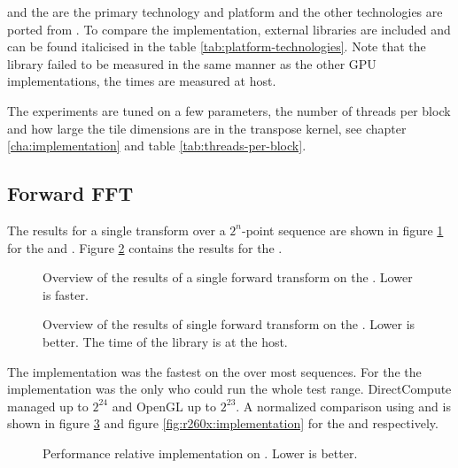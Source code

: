 {\CU} and the {\NVCARD} are the primary technology and platform and the other technologies are ported from {\CU}. To compare the implementation, external libraries are included and can be found italicised in the table \ref{tab:platform-technologies}. Note that the {\CLFFT} library failed to be measured in the same manner as the other GPU implementations, the times are measured at host.

The experiments are tuned on a few parameters, the number of threads per block and how large the tile dimensions are in the transpose kernel, see chapter \ref{cha:implementation} and table \ref{tab:threads-per-block}.

\subsection{Forward FFT}

The results for a single transform over a $2^{n}$-point sequence are shown in figure \ref{fig:gtx:overview} for the {\NVCARD} and {\INTELCPU}. Figure \ref{fig:r260x:overview} contains the results for the {\AMDCARD}.

\begin{figure}\AllPlacementOptions
	\centering
	
	\caption{Overview of the results of a single forward transform on the {\NVCARD}. Lower is faster.}
	\label{fig:gtx:overview}
\end{figure}

\begin{figure}[\AllPlacementOptions]
	\centering
	
	\caption{Overview of the results of single forward transform on the {\AMDCARD}. Lower is better. The time of the {\CLFFT} library is at the host.}
	\label{fig:r260x:overview}
\end{figure}

The {\CU} implementation was the fastest on the {\NVCARD} over most sequences. For the {\AMDCARD} the {\OCL} implementation was the only who could run the whole test range. DirectCompute managed up to $2^{24}$ and OpenGL up to $2^{23}$. A normalized comparison using {\CU} and {\OCL} is shown in figure \ref{fig:gtx:implementation} and figure \ref{fig:r260x:implementation} for the {\NVCARD} and {\AMDCARD} respectively.

\begin{figure}[\AllPlacementOptions]
	\centering
	
	\caption{Performance relative {\CU} implementation on {\NVCARD}. Lower is better.}
	\label{fig:gtx:implementation}
\end{figure}

